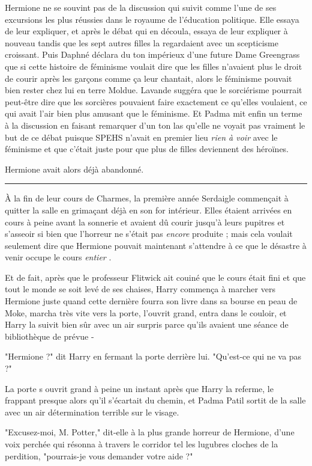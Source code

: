 Hermione ne se souvint pas de la discussion qui suivit comme l'une de ses excursions les plus réussies dans le royaume de l'éducation politique. Elle essaya de leur expliquer, et après le débat qui en découla, essaya de leur expliquer à nouveau tandis que les sept autres filles la regardaient avec un scepticisme croissant. Puis Daphné déclara du ton impérieux d'une future Dame Greengrass que si cette histoire de féminisme voulait dire que les filles n'avaient plus le droit de courir après les garçons comme ça leur chantait, alors le féminisme pouvait bien rester chez lui en terre Moldue. Lavande suggéra que le sorciérisme pourrait peut-être dire que les sorcières pouvaient faire exactement ce qu'elles voulaient, ce qui avait l'air bien plus amusant que le féminisme. Et Padma mit enfin un terme à la discussion en faisant remarquer d'un ton las qu'elle ne voyait pas vraiment le but de ce débat puisque SPEHS n'avait en premier lieu \emph{rien à voir}  avec le féminisme et que c'était juste pour que plus de filles deviennent des héroïnes.

Hermione avait alors déjà abandonné.
\par\noindent\rule{\textwidth}{0.4pt}
À la fin de leur cours de Charmes, la première année Serdaigle commençait à quitter la salle en grimaçant déjà en son for intérieur. Elles étaient arrivées en cours à peine avant la sonnerie et avaient dû courir jusqu'à leurs pupitres et s'asseoir si bien que l'horreur ne s'était pas \emph{encore}  produite ; mais cela voulait seulement dire que Hermione pouvait maintenant s'attendre à ce que le désastre à venir occupe le cours \emph{entier} .

Et de fait, après que le professeur Flitwick ait couiné que le cours était fini et que tout le monde se soit levé de ses chaises, Harry commença à marcher vers Hermione juste quand cette dernière fourra son livre dans sa bourse en peau de Moke, marcha très vite vers la porte, l'ouvrit grand, entra dans le couloir, et Harry la suivit bien sûr avec un air surpris parce qu'ils avaient une séance de bibliothèque de prévue -

"Hermione ?" dit Harry en fermant la porte derrière lui. "Qu'est-ce qui ne va pas ?"

La porte s ouvrit grand à peine un instant après que Harry la referme, le frappant presque alors qu'il s'écartait du chemin, et Padma Patil sortit de la salle avec un air détermination terrible sur le visage.

"Excusez-moi, M. Potter," dit-elle à la plus grande horreur de Hermione, d'une voix perchée qui résonna à travers le corridor tel les lugubres cloches de la perdition, "pourrais-je vous demander votre aide ?"

